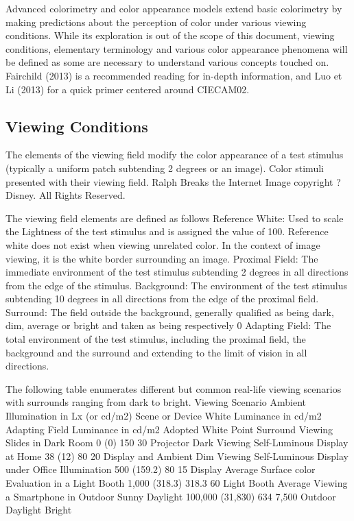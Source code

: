 Advanced colorimetry and color appearance models extend basic colorimetry by making predictions about the perception of color under various viewing conditions. While its exploration is out of the scope of this document, viewing conditions, elementary terminology and various color appearance phenomena will be defined as some are necessary to understand various concepts touched on. Fairchild (2013) is a recommended reading for in-depth information, and Luo et Li (2013) for a quick primer centered around CIECAM02.

\subsection{Viewing Conditions}%
\label{subsec:viewing-conditions}

The elements of the viewing field modify the color appearance of a test stimulus (typically a uniform patch subtending 2 degrees or an image).
Color stimuli presented with their viewing field.
Ralph Breaks the Internet Image copyright ?Disney. All Rights Reserved.

The viewing field elements are defined as follows
Reference White: Used to scale the Lightness of the test stimulus and is assigned the value of 100. Reference white does not exist when viewing unrelated color. In the context of image viewing, it is the white border surrounding an image.
Proximal Field: The immediate environment of the test stimulus subtending 2 degrees in all directions from the edge of the stimulus.
Background: The environment of the test stimulus subtending 10 degrees in all directions from the edge of the proximal field.
Surround: The field outside the background, generally qualified as being dark, dim, average or bright and taken as being respectively 0%
Adapting Field: The total environment of the test stimulus, including the proximal field, the background and the surround and extending to the limit of vision in all directions.

The following table enumerates different but common real-life viewing scenarios with surrounds ranging from dark to bright.
Viewing Scenario
Ambient Illumination in Lx (or cd/m2)
Scene or Device White Luminance in cd/m2
Adapting Field Luminance in cd/m2
Adopted White Point
Surround
Viewing Slides in Dark Room
0 (0)
150
30
Projector
Dark
Viewing Self-Luminous Display at Home
38 (12)
80
20
Display
and
Ambient
Dim
Viewing Self-Luminous Display under Office Illumination
500 (159.2)
80
15
Display
Average
Surface color Evaluation in a Light Booth
1,000 (318.3)
318.3
60
Light Booth
Average
Viewing a Smartphone in Outdoor Sunny Daylight
100,000 (31,830)
 634
7,500
Outdoor Daylight
Bright


